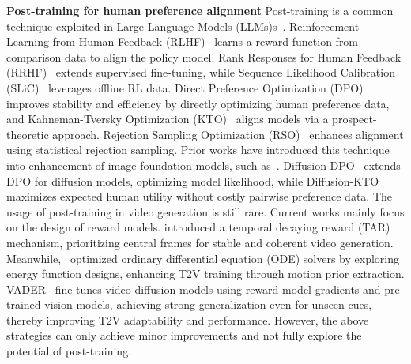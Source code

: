 \vspace{0.5\baselineskip}
\noindent\textbf{Post-training for human preference alignment}
Post-training is a common technique exploited in Large Language Models (LLMs)s~\cite{ouyang2022traininglanguagemodelsfollow, ramamurthy2023reinforcementlearningnotnatural, zheng2023secretsrlhflargelanguage}. Reinforcement Learning from Human Feedback (RLHF)~\cite{ouyang2022traininglanguagemodelsfollow} learns a reward function from comparison data to align the policy model. Rank Responses for Human Feedback (RRHF)~\cite{yuan2023rrhfrankresponsesalign} extends supervised fine-tuning, while Sequence Likelihood Calibration (SLiC)~\cite{zhao2023slichfsequencelikelihoodcalibration} leverages offline RL data. Direct Preference Optimization (DPO)~\cite{rafailov2024directpreferenceoptimizationlanguage} improves stability and efficiency by directly optimizing human preference data, and Kahneman-Tversky Optimization (KTO)~\cite{ethayarajh2024ktomodelalignmentprospect} aligns models via a prospect-theoretic approach. Rejection Sampling Optimization (RSO)~\cite{liu2024statisticalrejectionsamplingimproves} enhances alignment using statistical rejection sampling. Prior works have introduced this technique into enhancement of image foundation models, such as~\cite{clark2024directlyfinetuningdiffusionmodels, prabhudesai2024aligningtexttoimagediffusionmodels, xu2023imagerewardlearningevaluatinghuman}. Diffusion-DPO~\cite{wallace2023diffusionmodelalignmentusing} extends DPO for diffusion models, optimizing model likelihood, while Diffusion-KTO~\cite{li2024aligningdiffusionmodelsoptimizing} maximizes expected human utility without costly pairwise preference data. The usage of post-training in video generation is still rare. Current works mainly focus on the design of reward models. 
\cite{yuan2023instructvideoinstructingvideodiffusion} introduced a temporal decaying reward (TAR) mechanism, prioritizing central frames for stable and coherent video generation. Meanwhile,~\cite{li2024t2vturbov2enhancingvideogeneration} optimized ordinary differential equation (ODE) solvers by exploring energy function designs, enhancing T2V training through motion prior extraction. VADER~\cite{prabhudesai2024videodiffusionalignmentreward} fine-tunes video diffusion models using reward model gradients and pre-trained vision models, achieving strong generalization even for unseen cues, thereby improving T2V adaptability and performance. However, the above strategies can only achieve minor improvements and not fully explore the potential of post-training. 
